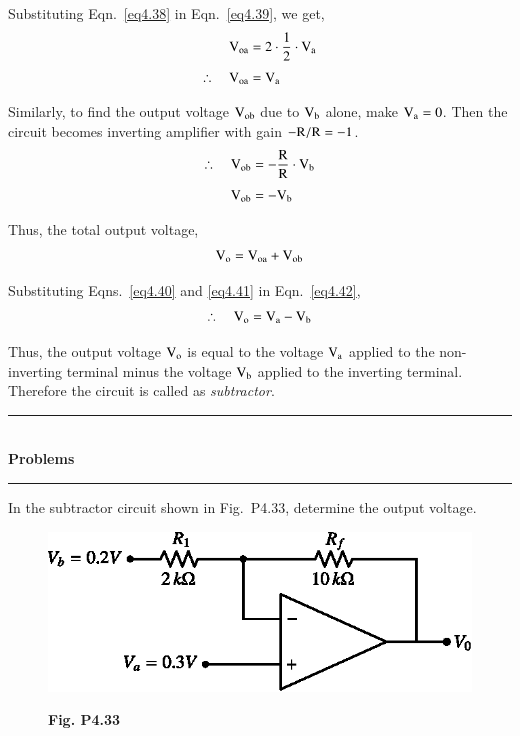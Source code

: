 Substituting Eqn.~\eqref{eq4.38} in Eqn.~\eqref{eq4.39}, we get,
\begin{align}
\textrm{V}_{\textrm{o}\textrm{a}} &= 2\cdot \frac{1}{2}\cdot \textrm{V}_{\textrm{a}}\notag\\[3pt]
\therefore\quad \textrm{V}_{\textrm{o}\textrm{a}} &= \textrm{V}_{\textrm{a}}\label{eq4.40}
\end{align}

Similarly, to find the output voltage $\textrm{V}_{\textrm{o}\textrm{b}}$ due to $\textrm{V}_{\textrm{b}}$ alone, make $\textrm{V}_{\textrm{a}}=0$. Then the circuit becomes inverting amplifier with gain $-\textrm{R}/\textrm{R}=-1$.
\begin{align}
\therefore\quad \textrm{V}_{\textrm{o}\textrm{b}} &= -\frac{\textrm{R}}{\textrm{R}}\cdot \textrm{V}_{\textrm{b}}\notag\\[3pt]
\textrm{V}_{\textrm{o}\textrm{b}} &= -\textrm{V}_{\textrm{b}}\label{eq4.41}
\end{align}

Thus, the total output voltage,
\begin{equation}
\textrm{V}_{\textrm{o}}=\textrm{V}_{\textrm{o}\textrm{a}}+\textrm{V}_{\textrm{o}\textrm{b}}\label{eq4.42}
\end{equation}

Substituting Eqns.~\eqref{eq4.40} and \eqref{eq4.41} in Eqn.~\eqref{eq4.42},
\begin{equation}
\therefore\quad \textrm{V}_{\textrm{o}}=\textrm{V}_{\textrm{a}}-\textrm{V}_{\textrm{b}}\label{eq4.43}
\end{equation}

Thus, the output voltage $\textrm{V}_{\textrm{o}}$ is equal to the voltage $\textrm{V}_{\textrm{a}}$ applied to the non-inverting terminal minus the voltage $\textrm{V}_{\textrm{b}}$ applied to the inverting terminal. Therefore the circuit is called as {\em subtractor}.

\eject

\begin{center}
\rule{4cm}{1pt}\\
{\bf\Large Problems}\\[-3pt]
\rule{4cm}{1pt}
\end{center}

\begin{problem}\label{prob4.33}
In the subtractor circuit shown in Fig.~P4.33, determine the output voltage.
\begin{figure}[H]
\centering
\includegraphics{chap4/figP4.32.eps}

\smallskip
{\bf Fig. P4.33}
\end{figure}
\end{problem}

